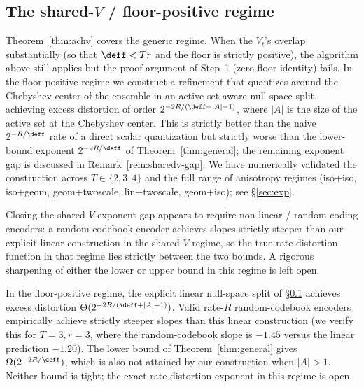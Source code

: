 \subsection{The shared-$V$ / floor-positive regime}
\label{subsec:sharedv}

Theorem~\ref{thm:achv} covers the generic regime. When the
$V_t$'s overlap substantially (so that $\deff < Tr$ and the
floor is strictly positive), the algorithm above still applies
but the proof argument of Step~1 (zero-floor identity) fails.
In the floor-positive regime we construct a refinement that
quantizes around the Chebyshev center of the ensemble in an
active-set-aware null-space split, achieving excess distortion
of order $2^{-2R/(\deff + |A| - 1)}$, where $|A|$ is the size
of the active set at the Chebyshev center. This is strictly
better than the naive $2^{-R/\deff}$ rate of a direct scalar
quantization but strictly worse than the lower-bound exponent
$2^{-2R/\deff}$ of Theorem~\ref{thm:general}; the remaining
exponent gap is discussed in Remark~\ref{rem:sharedv-gap}. We
have numerically validated the construction across
$T\in\{2,3,4\}$ and the full range of anisotropy regimes
(iso+iso, iso+geom, geom+twoscale, lin+twoscale, geom+iso); see
\S\ref{sec:exp}.

Closing the shared-$V$ exponent gap appears to require
non-linear / random-coding encoders: a random-codebook encoder
achieves slopes strictly steeper than our explicit linear
construction in the shared-$V$ regime, so the true
rate-distortion function in that regime lies strictly between
the two bounds. A rigorous sharpening of either the lower or
upper bound in this regime is left open.

\begin{remark}\label{rem:sharedv-gap}
In the floor-positive regime, the explicit linear null-space
split of \S\ref{subsec:sharedv} achieves excess distortion
$\Theta(2^{-2R/(\deff+|A|-1)})$. Valid rate-$R$ random-codebook
encoders empirically achieve strictly steeper slopes than this
linear construction (we verify this for $T=3, r=3$, where the
random-codebook slope is $-1.45$ versus the linear prediction
$-1.20$). The lower bound of
Theorem~\ref{thm:general} gives $\Omega(2^{-2R/\deff})$, which
is also not attained by our construction when $|A| > 1$. Neither
bound is tight; the exact rate-distortion exponent in this
regime is open.
\end{remark}
